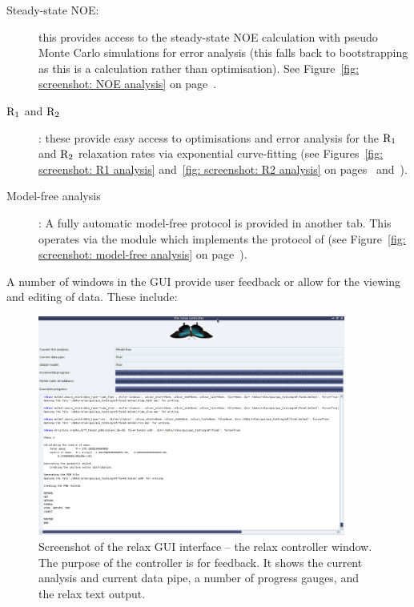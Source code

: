 \begin{description}
\item[Steady-state NOE:]  this provides access to the steady-state NOE calculation with pseudo Monte Carlo simulations for error analysis (this falls back to bootstrapping as this is a calculation rather than optimisation).  See Figure~\ref{fig: screenshot: NOE analysis} on page~\pageref{fig: screenshot: NOE analysis}.
\item[$\mathrm{R}_1$ and $\mathrm{R}_2$]:  these provide easy access to optimisations and error analysis for the $\mathrm{R}_1$ and $\mathrm{R}_2$ relaxation rates via exponential curve-fitting (see Figures~\ref{fig: screenshot: R1 analysis} and~\ref{fig: screenshot: R2 analysis} on pages~\pageref{fig: screenshot: R1 analysis} and~\pageref{fig: screenshot: R2 analysis}).
\item[Model-free analysis]:  A fully automatic model-free protocol is provided in another tab.  This operates via the  module which implements the protocol of \cite{dAuvergneGooley08b} (see Figure~\ref{fig: screenshot: model-free analysis} on page~\pageref{fig: screenshot: model-free analysis}).
\end{description}

A number of windows in the GUI provide user feedback or allow for the viewing and editing of data.  These include:

\begin{figure}
\centerline{\includegraphics[width=0.9\textwidth, bb=14 14 1065 768]{graphics/screenshots/relax_controller}}
\caption[relax controller screenshot]{Screenshot of the relax GUI interface -- the relax controller window.  The purpose of the controller is for feedback.  It shows the current analysis and current data pipe, a number of progress gauges, and the relax text output.}\label{fig: screenshot: relax controller}
\end{figure}

